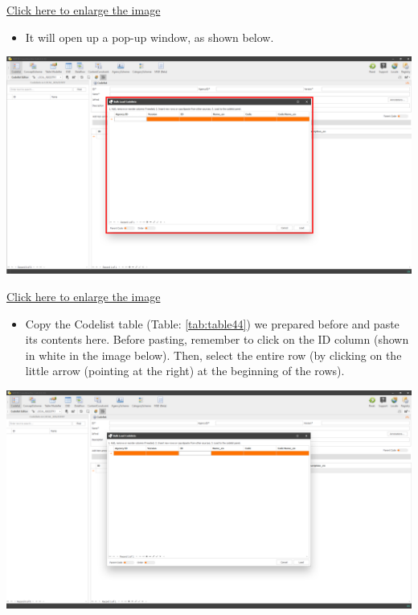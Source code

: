 \documentclass[
]{book}
\providecommand{\tightlist}{%
  \setlength{\itemsep}{0pt}\setlength{\parskip}{0pt}}
\begin{document}
\href{images/image084.png}{Click here to enlarge the image}

\begin{itemize}
\tightlist
\item
  It will open up a pop-up window, as shown below.
\end{itemize}

\begin{center}\includegraphics[width=1\linewidth]{./images/image086} \end{center}

\href{images/image086.png}{Click here to enlarge the image}

\begin{itemize}
\tightlist
\item
  Copy the Codelist table (Table: \ref{tab:table44}) we prepared before and paste its contents here. Before pasting, remember to click on the ID column (shown in white in the image below). Then, select the entire row (by clicking on the little arrow (pointing at the right) at the beginning of the rows).
\end{itemize}

\begin{center}\includegraphics[width=1\linewidth]{./images/image088} \end{center}
\end{document}
